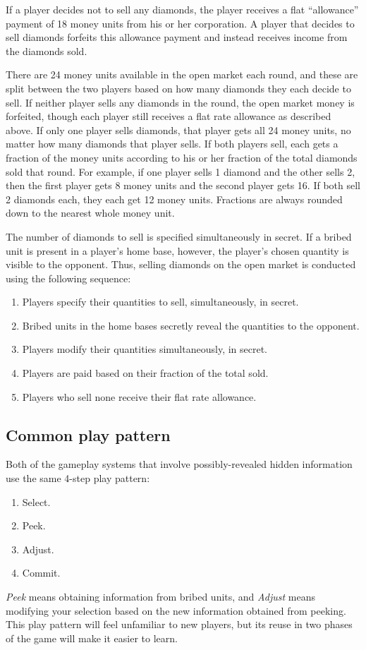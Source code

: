 \documentclass[8pt]{extarticle}
\begin{document}
If a player decides not to sell any diamonds, the player receives a flat ``allowance'' payment of 18 money units from his or her corporation.  A player that decides to sell diamonds forfeits this allowance payment and instead receives income from the diamonds sold.

There are 24 money units available in the open market each round, and these are split between the two players based on how many diamonds they each decide to sell.  If neither player sells any diamonds in the round, the open market money is forfeited, though each player still receives a flat rate allowance as described above.  If only one player sells diamonds, that player gets all 24 money units, no matter how many diamonds that player sells.  If both players sell, each gets a fraction of the money units according to his or her fraction of the total diamonds sold that round.  For example, if one player sells 1 diamond and the other sells 2, then the first player gets 8 money units and the second player gets 16.  If both sell 2 diamonds each, they each get 12 money units.  Fractions are always rounded down to the nearest whole money unit.   

The number of diamonds to sell is specified simultaneously in secret.  If a bribed unit is present in a player's home base, however, the player's chosen quantity is visible to the opponent.  Thus, selling diamonds on the open market is conducted using the following sequence: 
\begin{enumerate}
\item Players specify their quantities to sell, simultaneously, in secret.
\item Bribed units in the home bases secretly reveal the quantities to the opponent.
\item Players modify their quantities simultaneously, in secret.
\item Players are paid based on their fraction of the total sold.
\item Players who sell none receive their flat rate allowance.
\end{enumerate}

\subsection{Common play pattern}
Both of the gameplay systems that involve possibly-revealed hidden information use the same 4-step play pattern:
\begin{enumerate}
\item Select.
\item Peek.
\item Adjust.
\item Commit.
\end{enumerate}
{\it Peek} means obtaining information from bribed units, and {\it Adjust} means modifying your selection based on the new information obtained from peeking.  This play pattern will feel unfamiliar to new players, but its reuse in two phases of the game will make it easier to learn.
\end{document}

